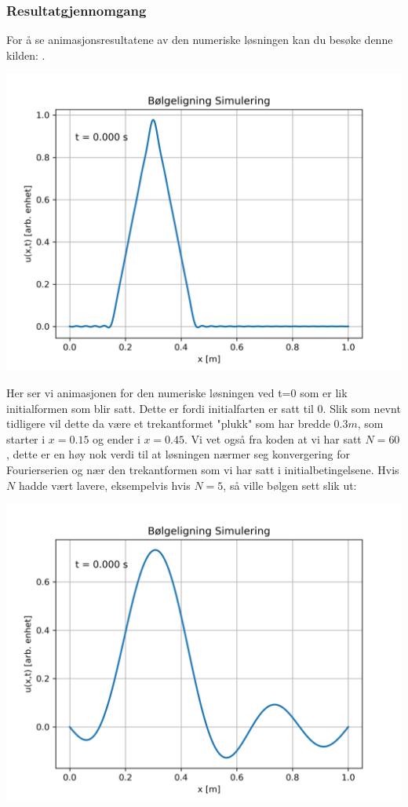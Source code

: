 \subsubsection{Resultatgjennomgang}
For å se animasjonsresultatene av den numeriske løsningen kan du besøke denne kilden: \parencite{simuleringVideo}.

\includegraphics[width=\textwidth]{figurer/bolgeligning_t0.png}

Her ser vi animasjonen for den numeriske løsningen ved t=0 som er lik initialformen som blir satt. Dette er fordi initialfarten er satt til $0$.
Slik som nevnt tidligere vil dette da være et trekantformet "plukk" som  har bredde $0.3m$, som starter i $x=0.15$ og ender i $x=0.45$. Vi 
vet også fra koden at vi har satt $N=60$, dette er en høy nok verdi til at løsningen nærmer seg konvergering for Fourierserien og nær den trekantformen som vi har satt i 
initialbetingelsene. Hvis $N$ hadde vært lavere, eksempelvis hvis $N=5$, så ville bølgen sett slik ut:

\includegraphics[width=\textwidth]{figurer/bolgeligning_t0_n5.png}

